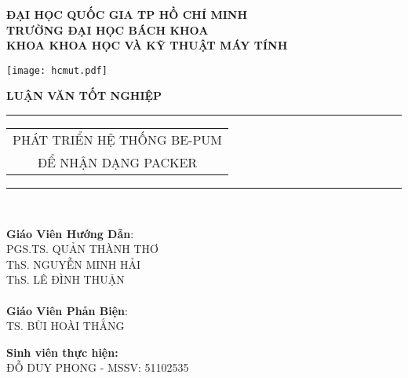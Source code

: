 



\begin{titlepage}


\vspace{-1cm}

\thispagestyle{empty}
\begin{center}
	\bfseries ĐẠI HỌC QUỐC GIA TP HỒ CHÍ MINH \\
	TRƯỜNG ĐẠI HỌC BÁCH KHOA \\
	KHOA KHOA HỌC VÀ KỸ THUẬT MÁY TÍNH\\
\end{center}

\vspace{0.5cm}

\begin{center}
\texttt{[image: hcmut.pdf]}\\[1cm]
\end{center}

\begin{center}
	\Large \bfseries LUẬN VĂN TỐT NGHIỆP \\[0.5cm]
\end{center}
\rule{\textwidth}{1pt}
\begin{center}
\Huge
	\begin{tabular}{@{}c}
		PHÁT TRIỂN HỆ THỐNG BE-PUM \\ 
		ĐỂ NHẬN DẠNG PACKER \\ [6pt]
	\end{tabular}
\end{center}
\rule{\textwidth}{1pt}\\[1cm]

\hspace{-0.5cm}
\begin{minipage}[t]{0.44\linewidth}
	\textbf{Giáo Viên Hướng Dẫn}: \\
		PGS.TS. QUẢN THÀNH THƠ\\
		ThS. NGUYỄN MINH HẢI\\
		ThS. LÊ ĐÌNH THUẬN\\\\
	\textbf{Giáo Viên Phản Biện}: \\
		 TS. BÙI HOÀI THẮNG
	\end{minipage}
\begin{minipage}[t]{0.60\linewidth}
	\textbf{Sinh viên thực hiện:}\\
		ĐỖ DUY PHONG - MSSV: 51102535
\end{minipage}


\end{titlepage}
